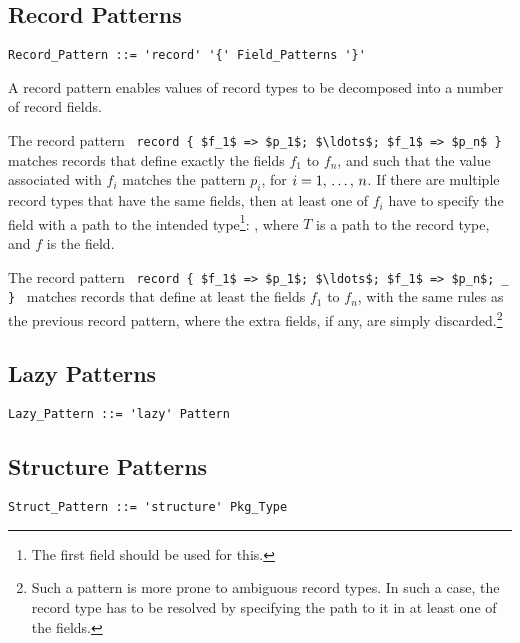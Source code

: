 \subsection{Record Patterns}
\label{sec:record-patterns}

\grammar\begin{lstlisting}
Record_Pattern ::= 'record' '{' Field_Patterns '}'
\end{lstlisting}

A record pattern enables values of record types to be decomposed into a number of record fields. 

The record pattern ~\lstinline!record { $f_1$ => $p_1$; $\ldots$; $f_1$ => $p_n$ }!~ matches records that define exactly the fields $f_1$ to $f_n$, and such that the value associated with $f_i$ matches the pattern $p_i$, for $i = 1 ,\, \ldots ,\, n$. If there are multiple record types that have the same fields, then at least one of $f_i$ have to specify the field with a path to the intended type\footnote{The first field should be used for this.}: , where $T$ is a path to the record type, and $f$ is the field. 

The record pattern ~\lstinline!record { $f_1$ => $p_1$; $\ldots$; $f_1$ => $p_n$; _ }!~ matches records that define at least the fields $f_1$ to $f_n$, with the same rules as the previous record pattern, where the extra fields, if any, are simply discarded.\footnote{Such a pattern is more prone to ambiguous record types. In such a case, the record type has to be resolved by specifying the path to it in at least one of the fields.}





\subsection{Lazy Patterns}
\label{sec:lazy-patterns}

\grammar\begin{lstlisting}
Lazy_Pattern ::= 'lazy' Pattern
\end{lstlisting}





\subsection{Structure Patterns}
\label{sec:structure-patterns}

\grammar\begin{lstlisting}
Struct_Pattern ::= 'structure' Pkg_Type
\end{lstlisting}

